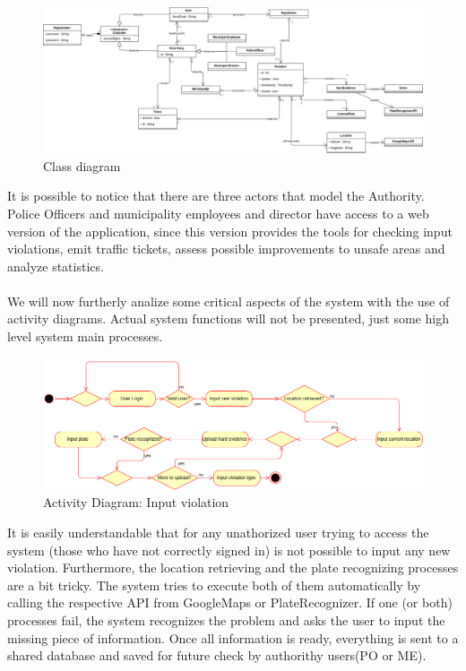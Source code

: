 \documentclass{article}
\begin{document}
\begin{figure}[H]
    \centering
    \includegraphics[scale=0.38,angle=90]{Images/umlmodel}
    \caption{Class diagram}
\end{figure}

It is possible to notice that there are three actors that model the Authority.
Police Officers and municipality employees and director have access to a web
version of the application, since this version provides the tools for checking
input violations, emit traffic tickets, assess possible improvements to
unsafe areas and analyze statistics.\\
\\
We will now furtherly analize some critical aspects of the system with the use
of activity diagrams. Actual system functions will not be presented, just some
high level system main processes.

\begin{figure}[H]
    \centering
    \includegraphics[scale=0.36]{Images/ActivityInputViolation}
    \caption{Activity Diagram: Input violation}
\end{figure}

It is easily understandable that for any unathorized user trying to access the
system (those who have not correctly signed in) is not possible to input any new
violation. Furthermore, the location retrieving and the plate recognizing
processes are a bit tricky. The system tries to execute both of them
automatically by calling the respective API from GoogleMaps or PlateRecognizer.
If one (or both) processes fail, the system recognizes the problem and asks the
user to input the missing piece of information. Once all information is ready,
everything is sent to a shared database and saved for future check by authorithy
users(PO or ME). 
\end{document}
